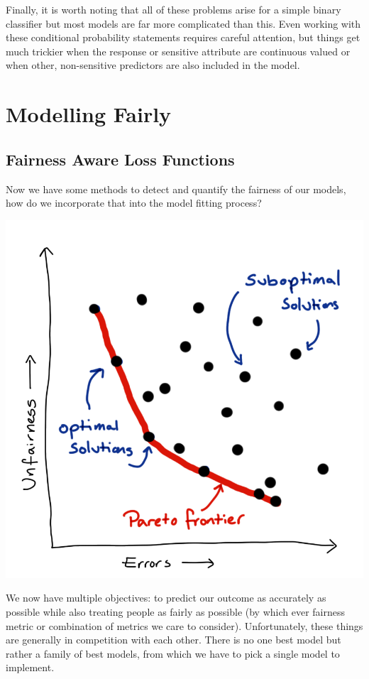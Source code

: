 \documentclass[
  letterpaper,
  DIV=11,
  numbers=noendperiod]{scrreprt}
\begin{document}
Finally, it is worth noting that all of these problems arise for a
simple binary classifier but most models are far more complicated than
this. Even working with these conditional probability statements
requires careful attention, but things get much trickier when the
response or sensitive attribute are continuous valued or when other,
non-sensitive predictors are also included in the model.

\section{Modelling Fairly}\label{modelling-fairly}

\subsection{Fairness Aware Loss
Functions}\label{fairness-aware-loss-functions}

Now we have some methods to detect and quantify the fairness of our
models, how do we incorporate that into the model fitting process?

\includegraphics{images/502-ethics-fairness/fairness-error-pareto-front.png}

We now have multiple objectives: to predict our outcome as accurately as
possible while also treating people as fairly as possible (by which ever
fairness metric or combination of metrics we care to consider).
Unfortunately, these things are generally in competition with each
other. There is no one best model but rather a family of best models,
from which we have to pick a single model to implement.
\end{document}
